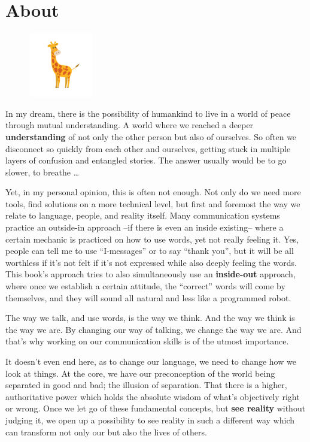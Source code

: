 \chapter{About}\label{ch:about}

\begin{figure}
    \centering
    \includegraphics[width=0.25\textwidth]{images/giraffe_small}
\end{figure}

In my dream, there is the possibility of humankind to live in a world of peace through mutual understanding.
A world where we reached a deeper \textbf{understanding} of not only the other person but also of ourselves.
So often we disconnect so quickly from each other and ourselves, getting stuck in multiple layers of confusion and entangled stories.
The answer usually would be to go slower, to breathe \ldots

Yet, in my personal opinion, this is often not enough.
Not only do we need more tools, find solutions on a more technical level, but first and foremost the way we relate to language, people, and reality itself.
Many communication systems practice an outside-in approach --if there is even an inside existing-- where a certain mechanic is practiced on how to use words, yet not really feeling it.
Yes, people can tell me to use ``I-messages'' or to say ``thank you'', but it will be all worthless if it's not felt if it's not expressed while also deeply feeling the words.
This book's approach tries to also simultaneously use an \textbf{inside-out} approach, where once we establish a certain attitude, the ``correct'' words will come by themselves, and they will sound all natural and less like a programmed robot.

The way we talk, and use words, is the way we think.
And the way we think is the way we are.
By changing our way of talking, we change the way we are.
And that's why working on our communication skills is of the utmost importance.


It doesn't even end here, as to change our language, we need to change how we look at things.
At the core, we have our preconception of the world being separated in good and bad; the illusion of separation.
That there is a higher, authoritative power which holds the absolute wisdom of what's objectively right or wrong.
Once we let go of these fundamental concepts, but \textbf{see reality} without judging it, we open up a possibility to see reality in such a different way which can transform not only our but also the lives of others.

